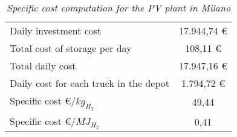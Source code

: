 \begin{table}[h]
\centering
\begin{tabular}{|l|c|}
\hline
\rowcolor{bluepoli!40} \multicolumn{2}{|c|}{\textbf{Specific cost computation - Milano}}             \\ \hline
\multicolumn{1}{|l|}{Daily investment cost}                  & 17.944,74 €                            \\ \hline
\multicolumn{1}{|l|}{Total cost of storage per day}          & 108,11 €                              \\ \hline
\multicolumn{1}{|l|}{Total daily cost}                       & 17.947,16 €                            \\ \hline
\multicolumn{1}{|l|}{Daily cost for each truck in the depot} & 1.794,72 €                              \\ \hline
\multicolumn{1}{|l|}{Specific cost €/$kg_{H_2}$}             & 49,44                                 \\ \hline
\multicolumn{1}{|l|}{Specific cost €/$MJ_{H_2}$}             & 0,41                                  \\ \hline
\end{tabular}
\caption{\textit{Specific cost computation for the PV plant in Milano}}
\label{tab:specificcostmilan}
\end{table}